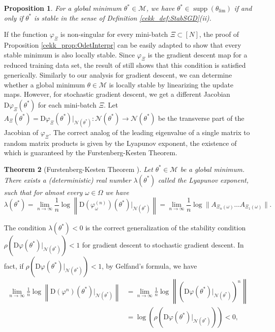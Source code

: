 \documentclass[10pt]{article}
\newtheorem{theorem}{Theorem}[section]
\newtheorem{proposition}[theorem]{Proposition}
\begin{document}
\begin{proposition}
	For a global minimum $\theta^* \in \mathcal M$, we have $\theta^* \in \operatorname{supp}(\theta_{\lim})$ if and only if $\theta^*$ is stable in the sense of Definition \ref{cekk_def:StabSGD}(ii).
\end{proposition}
If the function $\varphi_\Xi$ is non-singular for every mini-batch $\Xi \subset [N]$, the proof of Proposition \ref{cekk_prop:OdetInterpr} can be easily adapted to show that every stable minimum is also locally stable. Since $\varphi_\Xi$ is the gradient descent map for a reduced training data set, the result of \cite{Cruaciun24} still shows that this condition is satisfied generically. Similarly to our analysis for gradient descent, we can determine whether a global minimum $\theta \in \mathcal M$ is locally stable by linearizing the update maps. However, for stochastic gradient descent, we get a different Jacobian $\mathrm D \varphi_\Xi(\theta^*)$ for each mini-batch $\Xi$. Let $A_\Xi(\theta^*) = \mathrm D \varphi_\Xi(\theta^*)|_{\mathcal N(\theta^*)}: \mathcal N(\theta^*) \to \mathcal N(\theta^*)$
be the transverse part of the Jacobian of $\varphi_\Xi$. The correct analog of the leading eigenvalue of a single matrix to random matrix products is given by the Lyapunov exponent, the existence of which is guaranteed by the Furstenberg-Kesten Theorem.
\begin{theorem}[Furstenberg-Kesten Theorem \cite{Furstenberg60}]
	Let $\theta^*\in \mathcal M$ be a global minimum. There exists a (deterministic) real number $\lambda(\theta^*)$ called the \emph{Lyapunov exponent}, such that for almost every $\omega \in \Omega$ we have
	$$\lambda(\theta^*) = \lim_{n \to \infty} \frac{1}{n} \log \left\|\mathrm D \left(\varphi_\omega^{(n)}\right)(\theta^*)\big|_{\mathcal N(\theta^*)}\right\| = \lim_{n \to \infty} \frac{1}{n} \log \|A_{\Xi_n(\omega)} \dots A_{\Xi_1(\omega)}\|.$$
\end{theorem}
The condition $\lambda(\theta^*) < 0$ is the correct generalization of the stability condition $\rho(\mathrm D \varphi(\theta^*)|_{\mathcal N(\theta^*)}) < 1$ for gradient descent to stochastic gradient descent. In fact, if $\rho(\mathrm D \varphi(\theta^*)|_{\mathcal N(\theta^*)}) < 1$, by Gelfand's formula, we have
\begin{align*}
	\lim_{n \to \infty} \frac{1}{n} \log \left\|\mathrm D \left(\varphi^{n}\right)(\theta^*)\big|_{\mathcal N(\theta^*)}\right\| &= \lim_{n \to \infty} \frac{1}{n} \log \left\|\left(\mathrm D \varphi(\theta^*)\big|_{\mathcal N(\theta^*)}\right)^n\right\| \\
	&= \log(\rho(\mathrm D \varphi(\theta^*)|_{\mathcal N(\theta^*)})) < 0,
\end{align*}
\end{document}

